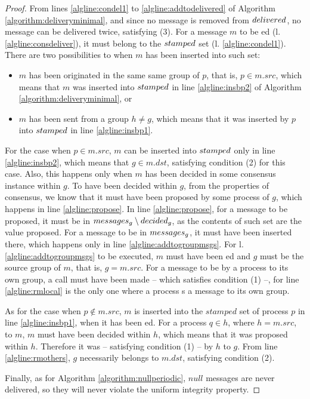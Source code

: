 \documentclass[times, 10pt]{article}
\begin{document}
\begin{proof}
From lines \ref{algline:condel1} to \ref{algline:addtodelivered} of Algorithm \ref{algorithm:deliveryminimal}, and since no message is removed from $delivered$, no message can be delivered twice, satisfying (3). For a message $m$ to be \amdel{}ed (l. \ref{algline:consdeliver}), it must belong to the $stamped$ set (l. \ref{algline:condel1}).  There are two possibilities to when $m$ has been inserted into such set:
\begin{itemize}
  \item $m$ has been originated in the same same group of $p$, that is, $p \in m.src$, which means that $m$ was inserted into $stamped$ in line \ref{algline:insbp2} of Algorithm \ref{algorithm:deliveryminimal}, or
  \item $m$ has been sent from a group $h \neq g$, which means that it was inserted by $p$ into $stamped$ in line \ref{algline:insbp1}. 
\end{itemize}

For the case when $p \in m.src$, $m$ can be inserted into $stamped$ only in line \ref{algline:insbp2}, which means that $g \in m.dst$, satisfying condition (2) for this case. Also, this happens only when $m$ has been decided in some consensus instance within $g$. To have been decided within $g$, from the properties of consensus, we know that it must have been proposed by some process of $g$, which happens in line \ref{algline:propose}. In line \ref{algline:propose}, for a message to be proposed, it must be in $messages\text{$_g$} \setminus decided\text{$_g$}$, as the contents of such set are the value proposed. For a message to be in $messages\text{$_g$}$, it must have been inserted there, which happens only in line \ref{algline:addtogroupmsgs}. For l. \ref{algline:addtogroupmsgs} to be executed, $m$ must have been \rmdel{}ed and $g$ must be the source group of $m$, that is, $g = m.src$. For a message to be \rmcast{} by a process to its own group, a  call must have been made -- which satisfies condition (1) --, for line \ref{algline:rmlocal} is the only one where a process \rmcast{}s a message to its own group. 

As for the case when $p \notin m.src$, $m$ is inserted into the $stamped$ set of process $p$ in line \ref{algline:insbp1}, when it has been \rmdel{}ed. For a process $q \in h$, where $h = m.src$, to \rmcast{} $m$, $m$ must have been decided within $h$, which means that it was proposed within $h$. Therefore it was \amcast{} -- satisfying condition (1) -- by $h$ to $g$. From line \ref{algline:rmothers}, $g$ necessarily belongs to $m.dst$, satisfying condition (2).

Finally, as for Algorithm \ref{algorithm:nullperiodic}, $null$ messages are never delivered, so they will never violate the uniform integrity property.
\end{proof}
\end{document}
